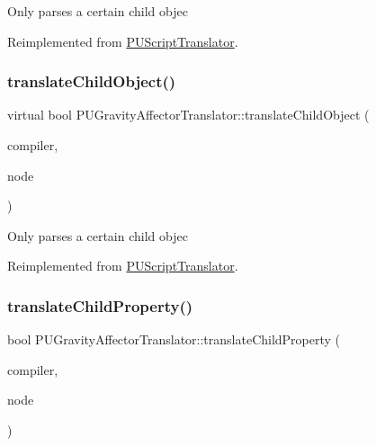 Only parses a certain child objec 

Reimplemented from \hyperlink{classPUScriptTranslator_ab587d01348ae3e678cb700c719b2b113}{P\+U\+Script\+Translator}.

\mbox{\label{classPUGravityAffectorTranslator_a087fa3a51cd56c59ea808888a41a9e1f}} 
\subsubsection{\texorpdfstring{translate\+Child\+Object()}{translateChildObject()}\hspace{0.1cm}{\footnotesize\ttfamily [2/2]}}
{\footnotesize\ttfamily virtual bool P\+U\+Gravity\+Affector\+Translator\+::translate\+Child\+Object (\begin{DoxyParamCaption}\item[{\hyperlink{classPUScriptCompiler}{P\+U\+Script\+Compiler} $\ast$}]{compiler,  }\item[{\hyperlink{classPUAbstractNode}{P\+U\+Abstract\+Node} $\ast$}]{node }\end{DoxyParamCaption})\hspace{0.3cm}{\ttfamily [virtual]}}

Only parses a certain child objec 

Reimplemented from \hyperlink{classPUScriptTranslator_ab587d01348ae3e678cb700c719b2b113}{P\+U\+Script\+Translator}.

\mbox{\label{classPUGravityAffectorTranslator_a72855cafb35558b3bd30ce2cec93d20b}} 
\subsubsection{\texorpdfstring{translate\+Child\+Property()}{translateChildProperty()}\hspace{0.1cm}{\footnotesize\ttfamily [1/2]}}
{\footnotesize\ttfamily bool P\+U\+Gravity\+Affector\+Translator\+::translate\+Child\+Property (\begin{DoxyParamCaption}\item[{\hyperlink{classPUScriptCompiler}{P\+U\+Script\+Compiler} $\ast$}]{compiler,  }\item[{\hyperlink{classPUAbstractNode}{P\+U\+Abstract\+Node} $\ast$}]{node }\end{DoxyParamCaption})\hspace{0.3cm}{\ttfamily [virtual]}}

